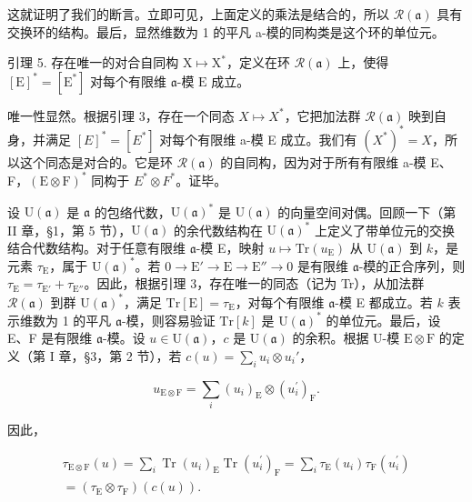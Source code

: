 这就证明了我们的断言。立即可见，上面定义的乘法是结合的，所以 \(\mathcal{R}(\mathfrak{a})\) 具有交换环的结构。最后，显然维数为 1 的平凡 a-模的同构类是这个环的单位元。

引理 5. 存在唯一的对合自同构 \(\mathrm{X} \mapsto \mathrm{X}^*\)，定义在环 \(\mathcal{R}(\mathfrak{a})\) 上，使得 \([\mathrm{E}]^* = [\mathrm{E}^*]\) 对每个有限维 \(\mathfrak{a}\)-模 \(\mathrm{E}\) 成立。

唯一性显然。根据引理 3，存在一个同态 \(X \mapsto X^{*}\)，它把加法群 \(\mathcal{R}(\mathfrak{a})\) 映到自身，并满足 \([E]^{*} = [E^{*}]\) 对每个有限维 a-模 E 成立。我们有 \((X^{*})^{*} = X\)，所以这个同态是对合的。它是环 \(\mathcal{R}(\mathfrak{a})\) 的自同构，因为对于所有有限维 a-模 E、F，\((\mathrm{E} \otimes \mathrm{F})^{*}\) 同构于 \(E^{*} \otimes F^{*}\)。证毕。

设 \(\mathrm{U}(\mathfrak{a})\) 是 \(\mathfrak{a}\) 的包络代数，\(\mathrm{U}(\mathfrak{a})^*\) 是 \(\mathrm{U}(\mathfrak{a})\) 的向量空间对偶。回顾一下（第 II 章，§1，第 5 节），\(\mathrm{U}(\mathfrak{a})\) 的余代数结构在 \(\mathrm{U}(\mathfrak{a})^*\) 上定义了带单位元的交换结合代数结构。对于任意有限维 \(\mathfrak{a}\)-模 E，映射 \(u \mapsto \mathrm{Tr}(u_{\mathrm{E}})\) 从 \(\mathrm{U}(\mathfrak{a})\) 到 \(k\)，是元素 \(\tau_{\mathrm{E}}\)，属于 \(\mathrm{U}(\mathfrak{a})^*\)。若 \(0 \longrightarrow \mathrm{E}' \longrightarrow \mathrm{E} \longrightarrow \mathrm{E}'' \longrightarrow 0\) 是有限维 \(\mathfrak{a}\)-模的正合序列，则 \(\tau_{\mathrm{E}} = \tau_{\mathrm{E}'} + \tau_{\mathrm{E}''}\)。因此，根据引理 3，存在唯一的同态（记为 Tr），从加法群 \(\mathcal{R}(\mathfrak{a})\) 到群 \(\mathrm{U}(\mathfrak{a})^*\)，满足 \(\mathrm{Tr}[\mathrm{E}] = \tau_{\mathrm{E}}\)，对每个有限维 \(\mathfrak{a}\)-模 E 都成立。若 \(k\) 表示维数为 1 的平凡 \(\mathfrak{a}\)-模，则容易验证 \(\mathrm{Tr}[k]\) 是 \(\mathrm{U}(\mathfrak{a})^*\) 的单位元。最后，设 E、F 是有限维 \(\mathfrak{a}\)-模。设 \(u \in \mathrm{U}(\mathfrak{a})\)，\(c\) 是 \(\mathrm{U}(\mathfrak{a})\) 的余积。根据 U-模 \(\mathrm{E} \otimes \mathrm{F}\) 的定义（第 I 章，§3，第 2 节），若 \(c(u) = \sum_{i} u_i \otimes u_i'\)，

\[
u _ {\mathrm{E} \otimes \mathrm{F}} = \sum_ {i} (u _ {i}) _ {\mathrm{E}} \otimes (u _ {i} ^ {\prime}) _ {\mathrm{F}}.
\]

因此，

\[
\begin{array}{l} \tau_ {\mathrm{E} \otimes \mathrm{F}} (u) = \sum_ {i} \operatorname{Tr} (u _ {i}) _ {\mathrm{E}} \operatorname{Tr} (u _ {i} ^ {\prime}) _ {\mathrm{F}} = \sum_ {i} \tau_ {\mathrm{E}} (u _ {i}) \tau_ {\mathrm{F}} (u _ {i} ^ {\prime}) \\ = (\tau_ {\mathrm{E}} \otimes \tau_ {\mathrm{F}}) (c (u)). \end{array}
\]

